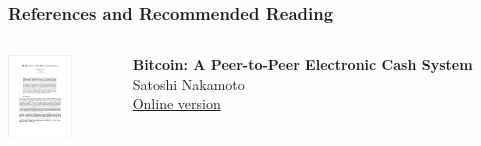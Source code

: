 \documentclass[handout]{beamer}
\begin{document}
\begin{frame}%
\frametitle{References and Recommended Reading}

		\begin{columns}[T]
			\begin{column}{0.1\textwidth}
					\includegraphics[width = 1.7cm, frame]{../assets/images/nakamoto_cover}
			\end{column} %
			\begin{column}{0.8\textwidth}
				\textbf{Bitcoin: A Peer-to-Peer Electronic Cash System} \\ 
				Satoshi Nakamoto \\
				\link \href{https://bitcoin.org/bitcoin.pdf}{Online version}
			\end{column}
		\end{columns}
	\vspace{1.5em}
	\vspace{1.5em}
	

\end{frame}
\end{document}
